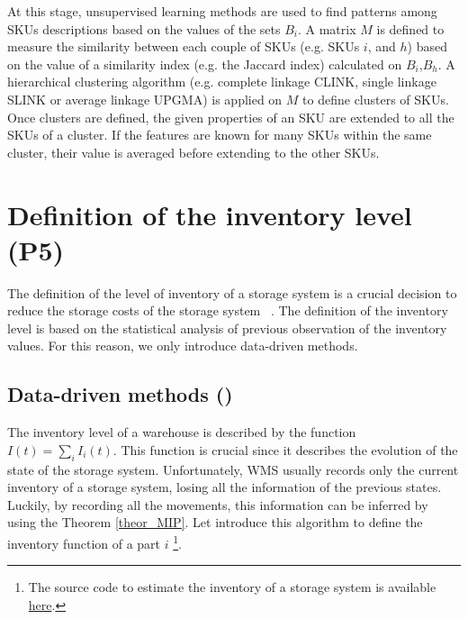 At this stage, unsupervised learning methods are used to find patterns among SKUs descriptions based on the values of the sets $B_i$. A matrix $M$ is defined to measure the similarity between each couple of SKUs (e.g. SKUs $i$, and $h$) based on the value of a similarity index (e.g. the Jaccard index) calculated on $B_i$,$B_h$. A hierarchical clustering algorithm (e.g. complete linkage CLINK, single linkage SLINK or average linkage UPGMA) is applied on $M$ to define clusters of SKUs. Once clusters are defined, the given properties of an SKU are extended to all the SKUs of a cluster. If the features are known for many SKUs within the same cluster, their value is averaged before extending to the other SKUs.

\section{Definition of the inventory level (P5)} \label{secInventoryDesign}
The definition of the level of inventory of a storage system is a crucial decision to reduce the storage costs of the storage system ~\cite{Cormier1999,Cormier1992,Goh2001, Hung1984, Levy1974, Lowe1979, Rao1998, Rosenblatt1984, Rosenblatt1988, White1971}. The definition of the inventory level is based on the statistical analysis of previous observation of the inventory values. For this reason, we only introduce data-driven methods.

\subsection{Data-driven methods ()}
The inventory level of a warehouse is described by the function $I\left(t\right)=\sum_{i}{I_i(t)}$. This function is crucial since it describes the evolution of the state of the storage system. Unfortunately, WMS usually records only the current inventory of a storage system, losing all the information of the previous states. Luckily, by recording all the movements, this information can be inferred by using the Theorem \ref{theor_MIP}. Let introduce this algorithm to define the inventory function of a part $i$ \footnote{The source code to estimate the inventory of a storage system is available \href{https://github.com/aletuf93/logproj/blob/master/logproj/information_framework.py}{here}.}.\par

